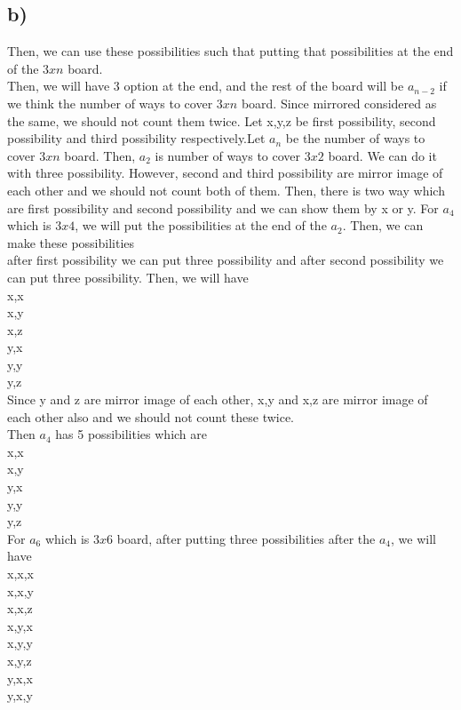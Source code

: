 \documentclass[12pt]{article}
\begin{document}
\subsection*{b)}
Then, we can use these possibilities such that putting that possibilities at the end of the $3xn$ board. \\
Then, we will have 3 option at the end, and the rest of the board will be $a_{n-2}$ if we think the number of ways to cover $3xn$ board. Since mirrored considered as the same, we should not count them twice. Let x,y,z be first possibility, second possibility and third possibility respectively.Let $a_{n}$ be the number of ways to cover $3xn$ board. Then, $a_2$ is number of ways to cover $3x2$ board. We can do it with three possibility. However, second and third possibility are mirror image of each other and we should not count both of them. Then, there is two way which are first possibility and second possibility and we can show them by x or y. For $a_4$ which is $3x4$, we will put the possibilities at the end of the $a_2$. Then, we can make these possibilities \\
after first possibility we can put three possibility and after second possibility we can put three possibility. Then, we will have \\
x,x \\
x,y \\
x,z \\
y,x \\
y,y \\
y,z \\
Since y and z are mirror image of each other, x,y and x,z are mirror image of each other also and we should not count these twice. \\
Then $a_4$ has 5 possibilities which are \\
x,x \\
x,y \\
y,x \\
y,y \\
y,z \\
For $a_6$ which is $3x6$ board, after putting three possibilities after the $a_4$, we will have \\
x,x,x \\
x,x,y \\
x,x,z \\
x,y,x \\
x,y,y \\
x,y,z \\
y,x,x \\
y,x,y \\
\end{document}
